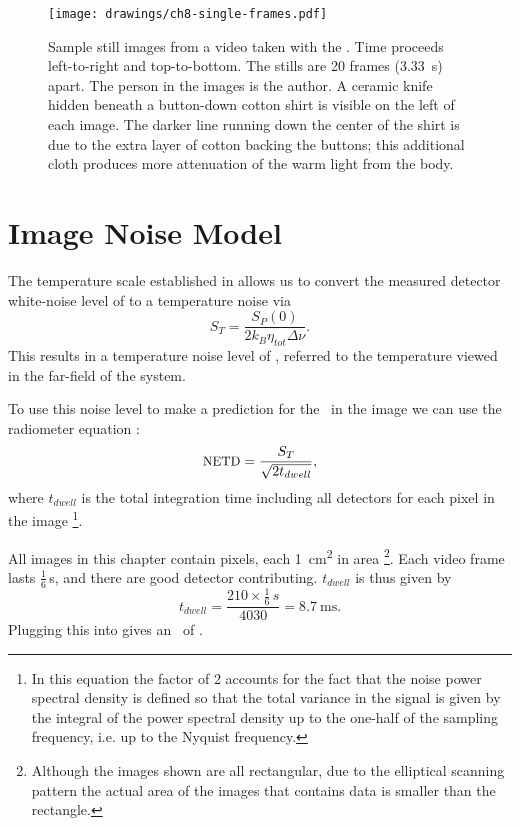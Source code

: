 
\begin{figure}[th]
\centering
\texttt{[image: drawings/ch8-single-frames.pdf]}
\caption{
Sample still images from a video taken with the \Imager.
Time proceeds left-to-right and top-to-bottom.
The stills are 20 frames (\SI{3.33}{\s}) apart.
The person in the images is the author.
A ceramic knife hidden beneath a button-down cotton shirt is visible on the left of each image.
The darker line running down the center of the shirt is due to the extra layer of cotton backing the buttons; this additional cloth produces more attenuation of the warm light from the body.
}
\label{fig:ch8-single-frames}
\end{figure}

\section{Image Noise Model}

The temperature scale established in  allows us to convert the measured detector white-noise level of  to a temperature noise via
\begin{equation}
  S_T = \frac{S_P(0)}{2 k_B \eta_{tot} \Delta \nu}.
\end{equation}
This results in a temperature noise level of , referred to the temperature viewed in the far-field of the system.

To use this noise level to make a prediction for the \NETD\ in the image we can use the radiometer equation \cite{xxx dicke-radiometer}:
\begin{equation} \label{eqn:ch8-radiometer}
  \text{{\small NETD}} = \frac{S_T}{\sqrt{2 t_{dwell}}},
\end{equation}
where $t_{dwell}$ is the total integration time including all detectors for each pixel in the image%
\footnote{%
In this equation the factor of 2 accounts for the fact that the noise power spectral density is defined so that the total variance in the signal is given by the integral of the power spectral density up to the one-half of the sampling frequency, i.e. up to the Nyquist frequency.
}.

All images in this chapter contain  pixels, each \SI{1}{\cm^2} in area%
\footnote{
  Although the images shown are all rectangular, due to the elliptical scanning pattern the actual area of the images that contains data is smaller than the rectangle.
}.
Each video frame lasts $\frac{1}{6}$\,\si{\s}, and there are  good detector contributing.
$t_{dwell}$ is thus given by
\begin{equation} \label{eqn:ch8-t-dwell}
  t_{dwell} = \frac{210 \times \frac{1}{6}\,\si{s}}{4030} = \SI{8.7}{\ms}.
\end{equation}
Plugging this into  gives an \NETD\ of .

